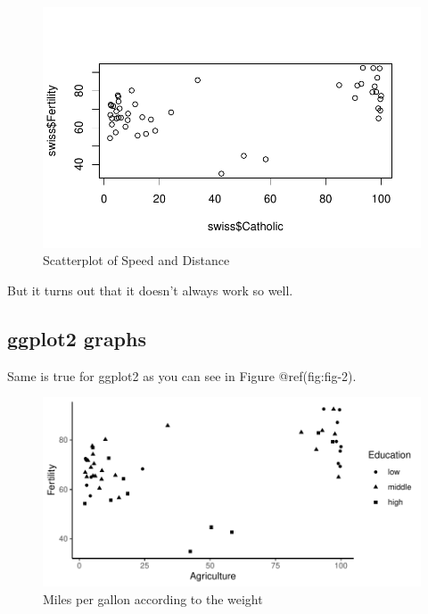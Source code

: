 \documentclass[
  letterpaper,
  DIV=11,
  numbers=noendperiod]{scrartcl}
\begin{document}
\begin{figure}[H]

{\centering \includegraphics{paper_files/figure-pdf/fig-1-1.pdf}

}

\caption{\label{fig-1}Scatterplot of Speed and Distance}

\end{figure}

But it turns out that it doesn't always work so well.

\hypertarget{ggplot2-graphs}{%
\subsection{ggplot2 graphs}\label{ggplot2-graphs}}

Same is true for ggplot2 as you can see in Figure @ref(fig:fig-2).

\begin{figure}[H]

{\centering \includegraphics{paper_files/figure-pdf/fig-2-1.pdf}

}

\caption{\label{fig-2}Miles per gallon according to the weight}

\end{figure}
\end{document}
